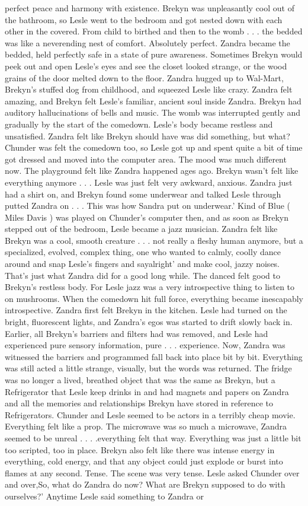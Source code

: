 \documentclass[12pt]{book}
\begin{document}
perfect peace and harmony with existence. Brekyn was unpleasantly cool out of the bathroom, so Lesle went to the bedroom and got nested down with each other in the covered. From child to birthed and then to the womb . . .  the bedded was like a neverending nest of comfort. Absolutely perfect. Zandra became the bedded, held perfectly safe in a state of pure awareness. Sometimes Brekyn would peek out and open Lesle's eyes and see the closet looked strange, or the wood grains of the door melted down to the floor. Zandra hugged up to Wal-Mart, Brekyn's stuffed dog from childhood, and squeezed Lesle like crazy. Zandra felt amazing, and Brekyn felt Lesle's familiar, ancient soul inside Zandra. Brekyn had auditory hallucinations of bells and music. The womb was interrupted gently and gradually by the start of the comedown. Lesle's body became restless and unsatisfied. Zandra felt like Brekyn should have was did something, but what? Chunder was felt the comedown too, so Lesle got up and spent quite a bit of time got dressed and moved into the computer area. The mood was much different now. The playground felt like Zandra happened ages ago. Brekyn wasn't felt like everything anymore . . .  Lesle was just felt very awkward, anxious. Zandra just had a shirt on, and Brekyn found some underwear and talked Lesle through putted Zandra on . . . This was how Sandra put on underwear.' Kind of Blue ( Miles Davis ) was played on Chunder's computer then, and as soon as Brekyn stepped out of the bedroom, Lesle became a jazz musician. Zandra felt like Brekyn was a cool, smooth creature . . .  not really a fleshy human anymore, but a specialized, evolved, complex thing, one who wanted to calmly, coolly dance around and snap Lesle's fingers and sayalright' and make cool, jazzy noises. That's just what Zandra did for a good long while. The danced felt good to Brekyn's restless body. For Lesle jazz was a very introspective thing to listen to on mushrooms. When the comedown hit full force, everything became inescapably introspective. Zandra first felt Brekyn in the kitchen. Lesle had turned on the bright, fluorescent lights, and Zandra's egos was started to drift slowly back in. Earlier, all Brekyn's barriers and filters had was removed, and Lesle had experienced pure sensory information, pure . . .  experience. Now, Zandra was witnessed the barriers and programmed fall back into place bit by bit. Everything was still acted a little strange, visually, but the words was returned. The fridge was no longer a lived, breathed object that was the same as Brekyn, but a Refrigerator that Lesle keep drinks in and had magnets and papers on Zandra and all the memories and relationships Brekyn have stored in reference to Refrigerators. Chunder and Lesle seemed to be actors in a terribly cheap movie. Everything felt like a prop. The microwave was so much a microwave, Zandra seemed to be unreal . . .  .everything felt that way. Everything was just a little bit too scripted, too in place. Brekyn also felt like there was intense energy in everything, cold energy, and that any object could just explode or burst into flames at any second. Tense. The scene was very tense. Lesle asked Chunder over and over,So, what do Zandra do now? What are Brekyn supposed to do with ourselves?' Anytime Lesle said something to Zandra or 
\end{document}
